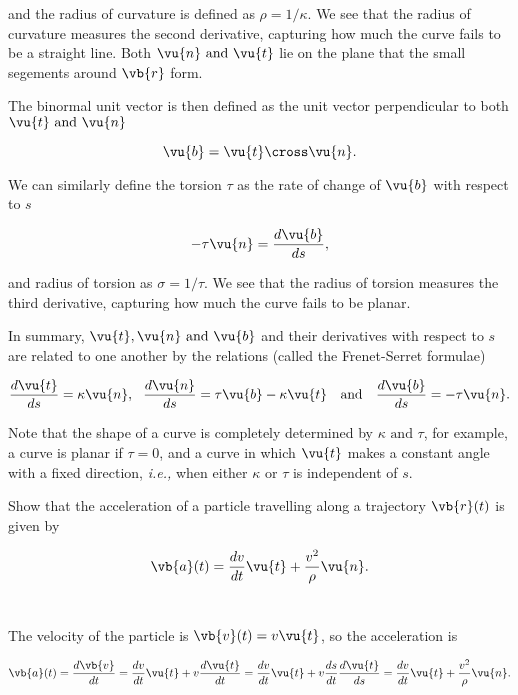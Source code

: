 \documentclass[english,a4paper,12pt]{report}
\begin{document}
and the radius of curvature is defined as \(\rho = 1/\kappa  \). We see that the radius of curvature measures the second derivative, capturing how much the curve fails to be a straight line. Both \(\vu{n} \text { and } \vu{t} \) lie on the plane that the small segements around \(\vb{r} \) form.  

The binormal unit vector is then defined as the unit vector perpendicular to both \(\vu{t}  \text { and } \vu{n} \) 

\begin{equation}
	\vu{b} = \vu{t} \cross \vu{n} .
\end{equation}

We can similarly define the torsion \(\tau \) as the rate of change of \(\vu{b} \) with respect to \(s\)  

\begin{equation}
	-\tau \vu{n} =  \frac{d \vu{b} }{ds}, 
\end{equation}

and radius of torsion as \(\sigma  = 1/ \tau  \). We see that the radius of torsion measures the third derivative, capturing how much the curve fails to be planar.

In summary, \(\vu{t} , \vu{n} \text { and } \vu{b} \) and their derivatives with respect to \(s\) are related to one another by the relations (called the Frenet-Serret formulae) 

\begin{equation}
	\frac{d \vu{t} }{ds} = \kappa \vu{n} , ~~\frac{d \vu{n} }{ds} = \tau \vu{b} - \kappa \vu{t}~~ \text { and } ~~\frac{d \vu{b} }{ds} = -\tau \vu{n} .  
\end{equation}

Note that the shape of a curve is completely determined by \(\kappa \text { and } \tau \), for example, a curve is planar if \(\tau = 0\), and a curve in which \(\vu{t} \) makes a constant angle with a fixed direction, \textit{i.e.,} when either \(\kappa \text { or } \tau \) is independent of \(s\). 



{Show that the acceleration of a particle travelling along a trajectory \(\vb{r} (t)\) is given by 

\begin{equation}
	\vb{a} (t) = \frac{dv}{dt} \vu{t} + \frac{v^2}{\rho } \vu{n} .  
\end{equation}
~
}
{The velocity of the particle is \(\vb{v} (t) = v \vu{t} \), so the acceleration is 

\begin{equation}
	\vb{a} (t) = \frac{d\vb{v} }{dt} = \frac{dv}{dt} \vu{t} + v \frac{d \vu{t} }{dt} = \frac{dv}{dt}\vu{t} + v \frac{ds}{dt}\frac{d \vu{t} }{ds} = \frac{dv}{dt} \vu{t} + \frac{v^2}{\rho }\vu{n} .       
\end{equation}
~
}
\end{document}
